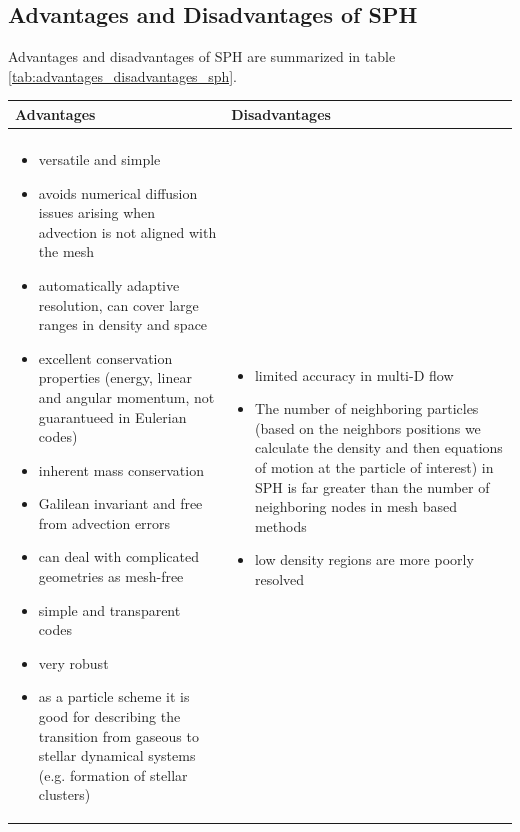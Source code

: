 \subsection{Advantages and Disadvantages of SPH}
Advantages and disadvantages of SPH are summarized in table \ref{tab:advantages_disadvantages_sph}.

\begin{table}[!htb]
    \centering
    \begin{tabular}{p{}|p{}}
        \textcolor{green1}{Advantages} & \textcolor{red1}{Disadvantages} \\
        \hline \\
        \begin{itemize}
            \item versatile and simple
            \item avoids numerical diffusion issues arising when advection is not aligned with the mesh
            \item automatically adaptive resolution, can cover large ranges in density and space
            \item excellent conservation properties (energy, linear and angular momentum, not guarantueed in Eulerian codes)
            \item inherent mass conservation
            \item Galilean invariant and free from advection errors
            \item can deal with complicated geometries as mesh-free
            \item simple and transparent codes
            \item very robust
            \item as a particle scheme it is good for describing the transition from gaseous to stellar dynamical systems (e.g. formation of stellar clusters)
        \end{itemize} &
        \begin{itemize}
            \item limited accuracy in multi-D flow
            \item The number of neighboring particles (based on the neighbors positions we calculate the density and then equations of motion at the particle of interest) in SPH is far greater than the number of neighboring nodes in mesh based methods
            \item low density regions are more poorly resolved

\end{itemize}
\end{tabular}
\end{table}
